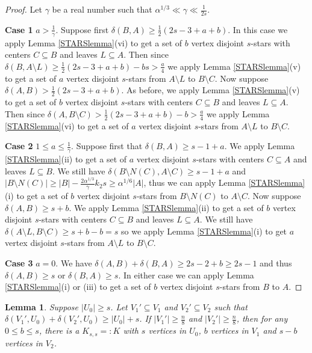 \documentclass[oneside,12pt]{memoir}
\newtheorem{lemma}[theorem]{Lemma}
\begin{document}
\begin{proof}
Let $\gamma$ be a real number such that $\alpha^{1/3}\ll \gamma\ll \frac{1}{2s}$.  

\noindent
\textbf{Case 1} $a>\frac{1}{\gamma}$.  Suppose first $\delta(B, A)\geq \frac{1}{2}(2s-3+a+b)$.  In this case we apply Lemma \ref{STARSlemma}(vi) to get a set of $b$ vertex disjoint $s$-stars with centers $C\subseteq B$ and leaves $L\subseteq A$.  Then since $\delta(B, A\setminus L)\geq \frac{1}{2}(2s-3+a+b)-bs>\frac{a}{4}$ we apply Lemma \ref{STARSlemma}(v) to get a set of $a$ vertex disjoint $s$-stars from $A\setminus L$ to $B\setminus C$.  Now suppose $\delta(A, B)> \frac{1}{2}(2s-3+a+b)$.  As before, we apply Lemma \ref{STARSlemma}(v) to get a set of $b$ vertex disjoint $s$-stars with centers $C\subseteq B$ and leaves $L\subseteq A$.  Then since $\delta(A, B\setminus C)> \frac{1}{2}(2s-3+a+b)-b>\frac{a}{4}$ we apply Lemma \ref{STARSlemma}(vi) to get a set of $a$ vertex disjoint $s$-stars from $A\setminus L$ to $B\setminus C$.

\noindent
\textbf{Case 2} $1\leq a\leq \frac{1}{\gamma}$.  Suppose first that $\delta(B, A)\geq s-1+a$.  We apply Lemma \ref{STARSlemma}(ii) to get a set of $a$ vertex disjoint $s$-stars with centers $C\subseteq A$ and leaves $L\subseteq B$.  We still have $\delta(B\setminus N(C), A\setminus C)\geq s-1+a$ and $|B\setminus N(C)|\geq |B|-\frac{2\alpha^{1/3}}{\gamma}k_2s\geq \alpha^{1/6}|A|$, thus we can apply Lemma \ref{STARSlemma}(i) to get a set of $b$ vertex disjoint $s$-stars from $B\setminus N(C)$ to $A\setminus C$.  Now suppose $\delta(A, B)\geq s+b$.  We apply Lemma \ref{STARSlemma}(ii) to get a set of $b$ vertex disjoint $s$-stars with centers $C\subseteq B$ and leaves $L\subseteq A$.  We still have $\delta(A\setminus L, B\setminus C)\geq s+b-b=s$ so we apply Lemma \ref{STARSlemma}(i) to get $a$ vertex disjoint $s$-stars from $A\setminus L$ to $B\setminus C$.

\noindent
\textbf{Case 3} $a=0$.  We have $\delta(A, B)+\delta(B, A)\geq 2s-2+b\geq 2s-1$ and thus $\delta(A, B)\geq s$ or $\delta(B, A)\geq s$.  In either case we can apply Lemma \ref{STARSlemma}(i) or (iii) to get a set of $b$ vertex disjoint $s$-stars from $B$ to $A$.

\end{proof}



\begin{lemma}\label{K_1sum}
Suppose $|U_0|\geq s$.  Let $V_1'\subseteq V_1$ and $V_2'\subseteq V_2$ such that $\delta(V_1', U_0)+\delta(V_2', U_0)\geq |U_0|+s$.  If $|V_1'|\geq\frac{n}{8}$ and $|V_2'|\geq\frac{n}{8}$, then for any $0\leq b\leq s$, there is a $K_{s,s}=:K$ with $s$ vertices in $U_0$, $b$ vertices in $V_1$ and $s-b$ vertices in $V_2$. 
\end{lemma}
\end{document}
